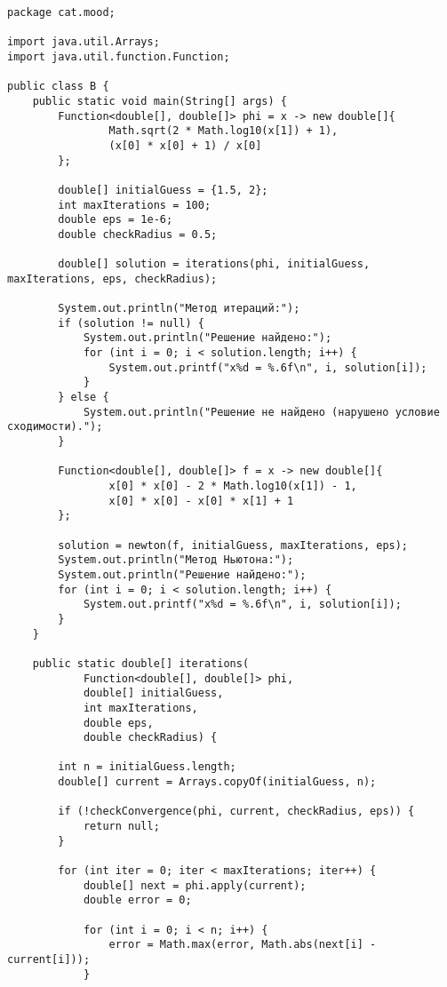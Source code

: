 \begin{verbatim}
package cat.mood;

import java.util.Arrays;
import java.util.function.Function;

public class B {
    public static void main(String[] args) {
        Function<double[], double[]> phi = x -> new double[]{
                Math.sqrt(2 * Math.log10(x[1]) + 1),
                (x[0] * x[0] + 1) / x[0]
        };

        double[] initialGuess = {1.5, 2};
        int maxIterations = 100;
        double eps = 1e-6;
        double checkRadius = 0.5;

        double[] solution = iterations(phi, initialGuess, maxIterations, eps, checkRadius);

        System.out.println("Метод итераций:");
        if (solution != null) {
            System.out.println("Решение найдено:");
            for (int i = 0; i < solution.length; i++) {
                System.out.printf("x%d = %.6f\n", i, solution[i]);
            }
        } else {
            System.out.println("Решение не найдено (нарушено условие сходимости).");
        }

        Function<double[], double[]> f = x -> new double[]{
                x[0] * x[0] - 2 * Math.log10(x[1]) - 1,
                x[0] * x[0] - x[0] * x[1] + 1
        };

        solution = newton(f, initialGuess, maxIterations, eps);
        System.out.println("Метод Ньютона:");
        System.out.println("Решение найдено:");
        for (int i = 0; i < solution.length; i++) {
            System.out.printf("x%d = %.6f\n", i, solution[i]);
        }
    }

    public static double[] iterations(
            Function<double[], double[]> phi,
            double[] initialGuess,
            int maxIterations,
            double eps,
            double checkRadius) {

        int n = initialGuess.length;
        double[] current = Arrays.copyOf(initialGuess, n);

        if (!checkConvergence(phi, current, checkRadius, eps)) {
            return null;
        }

        for (int iter = 0; iter < maxIterations; iter++) {
            double[] next = phi.apply(current);
            double error = 0;

            for (int i = 0; i < n; i++) {
                error = Math.max(error, Math.abs(next[i] - current[i]));
            }


\end{verbatim}
